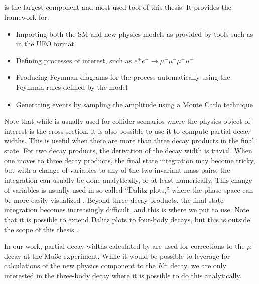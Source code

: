 \subsection{\madgraph}
\madgraph is the largest component and most used tool of this thesis.
It provides the framework for:
\begin{itemize}
    \item Importing both the SM and new physics models as provided by tools such as \feynrules in the UFO format
    \item Defining processes of interest, such as $e^+ e^- \rightarrow \mu^+ \mu^- \mu^+ \mu^-$
    \item Producing Feynman diagrams for the process automatically using the Feynman rules defined by the model
    \item Generating events by sampling the amplitude using a Monte Carlo technique
\end{itemize}

Note that while \madgraph is usually used for collider scenarios where the physics object of interest is the cross-section, it is also possible to use it to compute partial decay widths.
This is useful when there are more than three decay products in the final state.
For two decay products, the derivation of the decay width is trivial.
When one moves to three decay products, the final state integration may become tricky, but with a change of variables to any of the two invariant mass pairs, the integration can usually be done analytically, or at least numerically.
This change of variables is usually used in so-called ``Dalitz plots,'' where the phase space can be more easily visualized \cite{Agashe:2014kda}.
Beyond three decay products, the final state integration becomes increasingly difficult, and this is where we put \madgraph to use.
Note that it is possible to extend Dalitz plots to four-body decays, but this is outside the scope of this thesis \cite{2007JPhB...40.3091S}.

In our work, partial decay widths calculated by \madgraph are used for corrections to the $\mu^+$ decay at the Mu3e experiment.
While it would be possible to leverage \madgraph for calculations of the new physics component to the $K^\pm$ decay, we are only interested in the three-body decay where it is possible to do this analytically.

